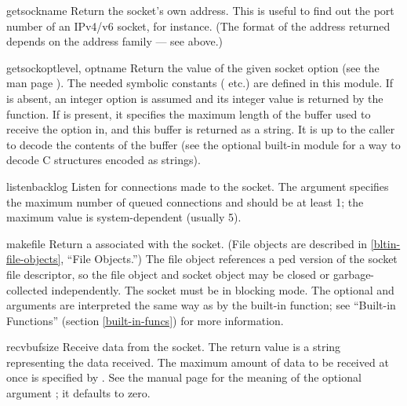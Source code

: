 \begin{methoddesc}[socket]{getsockname}{}
Return the socket's own address.  This is useful to find out the port
number of an IPv4/v6 socket, for instance.
(The format of the address returned depends on the address family ---
see above.)
\end{methoddesc}

\begin{methoddesc}[socket]{getsockopt}{level, optname}
Return the value of the given socket option (see the \UNIX{} man page
).  The needed symbolic constants
( etc.) are defined in this module.  If 
is absent, an integer option is assumed and its integer value
is returned by the function.  If  is present, it specifies
the maximum length of the buffer used to receive the option in, and
this buffer is returned as a string.  It is up to the caller to decode
the contents of the buffer (see the optional built-in module
 for a way to decode C structures encoded as strings).
\end{methoddesc}

\begin{methoddesc}[socket]{listen}{backlog}
Listen for connections made to the socket.  The  argument
specifies the maximum number of queued connections and should be at
least 1; the maximum value is system-dependent (usually 5).
\end{methoddesc}

\begin{methoddesc}[socket]{makefile}{}
Return a  associated with the socket.  (File objects
are described in \ref{bltin-file-objects}, ``File Objects.'')
The file object references a ped version of the
socket file descriptor, so the file object and socket object may be
closed or garbage-collected independently.
The socket must be in blocking mode.
The optional 
and  arguments are interpreted the same way as by the
built-in  function; see ``Built-in Functions''
(section \ref{built-in-funcs}) for more information.
\end{methoddesc}

\begin{methoddesc}[socket]{recv}{bufsize}
Receive data from the socket.  The return value is a string representing
the data received.  The maximum amount of data to be received
at once is specified by .  See the \UNIX{} manual page
 for the meaning of the optional argument
; it defaults to zero.
\end{methoddesc}

